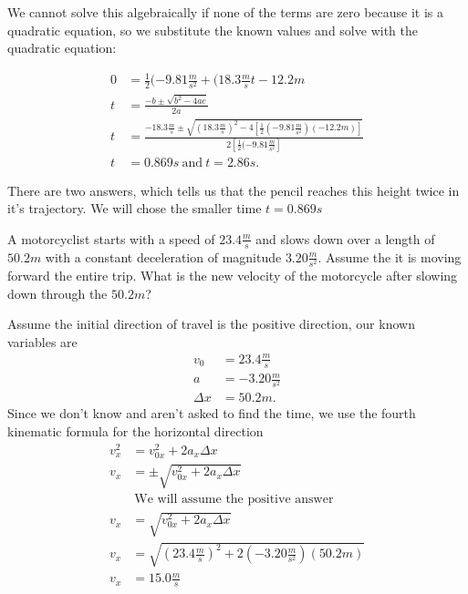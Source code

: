 \begin{note}[]
	We cannot solve this algebraically if none of the terms are zero because it is a
	quadratic equation, so we substitute the known values and solve with the quadratic equation:
\end{note}
\begin{align*}
	0 &= \frac{1}{2}(-9.81 \frac{m}{s^2} + (18.3 \frac{m}{s}t - 12.2 m \\
	t &= \frac{-b \pm \sqrt{b^2 - 4ac}}{2a} \\
	t &= \frac{-18.3 \frac{m}{s} \pm \sqrt{(18.3 \frac{m}{s})^2 - 4 \left[ \frac{1}{2}(-9.81 \frac{m}{s^2})(-12.2m)\right]  }}{2\left[ \frac{1}{2}(-9.81 \frac{m}{s^2} \right] } \\
	t &= 0.869s \:\text{and}\:t = 2.86 s
.\end{align*}

There are two answers, which tells us that the pencil reaches this height twice in it's trajectory. We will chose
the smaller time $t = 0.869 s$

\begin{example}[fourth kinematic formula, $v^2 = v_0^2 + 2a \Delta x$]
A motorcyclist starts with a speed of $23.4 \frac{m}{s}$ and slows down over a length of $50.2 m$
with a constant deceleration of magnitude $3.20 \frac{m}{s^2}$. Assume the it is moving forward
the entire trip. What is the new velocity of the motorcycle after slowing down through the $50.2 m$?
\end{example}
\begin{solution}[]
	Assume the initial direction of travel is the positive direction, our known variables are
	\begin{align*}
		v_0 &=  23.4 \frac{m}{s} \\
		a &=  -3.20 \frac{m}{s^2} \\
		\Delta x &= 50.2 m
	.\end{align*}
	Since we don't know and aren't asked to find the time, we use the fourth kinematic formula
	for the horizontal direction
	\begin{align*}
		v_x^2 &=  v_{0x}^2 +2a_x\Delta x \\
		v_{x} &=  \pm \sqrt{v_{0x}^2 + 2a_{x}\Delta x}  \\
			  &\:\text{We will assume the positive answer}\: \\
		v_{x} &=  \sqrt{v_{0x}^2 + 2a_{x}\Delta x}  \\
		v_{x} &= \sqrt{(23.4 \frac{m}{s})^2 + 2(-3.20 \frac{m}{s^2})(50.2m)} \\
		v_{x} &= 15.0 \frac{m}{s}
	\end{align*}
\end{solution}

\newpage


